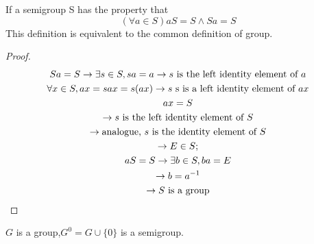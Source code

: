 \begin{Def}[Group]
    If a semigroup S has the property that
    \[
        (\forall a \in S) aS=S \wedge Sa=S
    \]
    This definition is equivalent to the common definition of group. 
    \begin{proof}
        \begin{gather*}
            Sa=S \rightarrow \exists s \in S, sa=a \rightarrow s \text{\space is the left identity element of }a \\
            \forall x \in S, ax=sax=s(ax) \rightarrow s \text{\space s is a left identity element of } ax   \\
            {ax}=S  \\
            \rightarrow s \text{\space is the left identity element of } S  \\
            \rightarrow \text{analogue, }s \text{\space is the identity element of }S   \\
            \rightarrow E \in S \text{;}\\
            aS=S \rightarrow \exists b \in S, ba=E \\
            \rightarrow b=a^{-1}    \\
            \rightarrow S\text{\space is a group}
        \end{gather*}
    \end{proof}
\end{Def}

\begin{Def}[0-Group]
    $G$ is a group,$G^0=G\cup\{0\}$ is a semigroup.
\end{Def}


